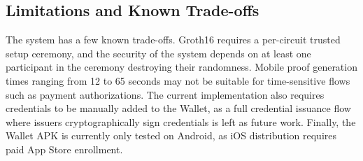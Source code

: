 \subsection{Limitations and Known Trade-offs}

The system has a few known trade-offs. Groth16 requires a per-circuit trusted setup ceremony, and the security of the system depends on at least one participant in the ceremony destroying their randomness. Mobile proof generation times ranging from 12 to 65 seconds may not be suitable for time-sensitive flows such as payment authorizations. The current implementation also requires credentials to be manually added to the Wallet, as a full credential issuance flow where issuers cryptographically sign credentials is left as future work. Finally, the Wallet APK is currently only tested on Android, as iOS distribution requires paid App Store enrollment.

